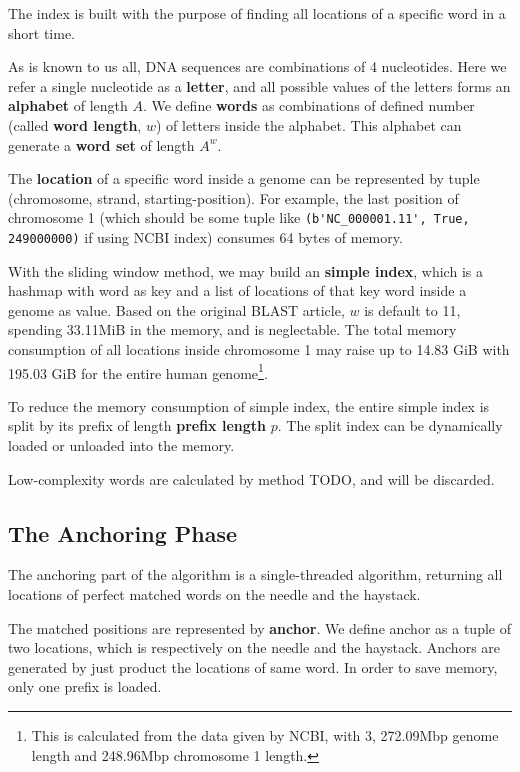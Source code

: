 \documentclass[10pt,final,journal,twocolumn,a4paper]{IEEEtran}
\begin{document}
The index is built with the purpose of finding all locations of a specific word in a short time.

As is known to us all, DNA sequences are combinations of 4 nucleotides. Here we refer a single nucleotide as a \textbf{letter}, and all possible values of the letters forms an \textbf{alphabet} of length $A$. We define \textbf{words} as combinations of defined number (called \textbf{word length}, $w$) of letters inside the alphabet. This alphabet can generate a \textbf{word set} of length $A^{w}$.

The \textbf{location} of a specific word inside a genome can be represented by tuple (chromosome, strand, starting-position). For example, the last position of chromosome 1 (which should be some tuple like \verb|(b'NC_000001.11', True, 249000000)| if using NCBI index) consumes 64 bytes of memory.

With the sliding window method, we may build an \textbf{simple index}, which is a hashmap with word as key and a list of locations of that key word inside a genome as value. Based on the original BLAST article, $w$ is default to 11, spending 33.11MiB in the memory, and is neglectable. The total memory consumption of all locations inside chromosome 1 may raise up to 14.83 GiB with 195.03 GiB for the entire human genome\footnote{This is calculated from the data given by NCBI, with 3, 272.09Mbp genome length and 248.96Mbp chromosome 1 length.}.

To reduce the memory consumption of simple index, the entire simple index is split by its prefix of length \textbf{prefix length} $p$. The split index can be dynamically loaded or unloaded into the memory.

Low-complexity words are calculated by method TODO, and will be discarded.

\subsection{The \textbf{Anchoring} Phase}

The anchoring part of the algorithm is a single-threaded algorithm, returning all locations of perfect matched words on the needle and the haystack.

The matched positions are represented by \textbf{anchor}. We define anchor as a tuple of two locations, which is respectively on the needle and the haystack. Anchors are generated by just product the locations of same word. In order to save memory, only one prefix is loaded.
\end{document}
